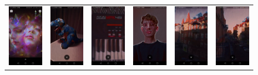 \documentclass[../Main.tex]{subfiles}
\begin{document}
\begin{figure}[H]
\begin{tabular}{cccccc}
\includegraphics[width = 0.13\linewidth]{Images/app_photos/filters/lets.jpg} &
\includegraphics[width = 0.13\linewidth]{Images/app_photos/dino/lets.jpg} &
\includegraphics[width = 0.13\linewidth]{Images/app_photos/akai/lets.jpg} &
\includegraphics[width = 0.13\linewidth]{Images/app_photos/me/lets.jpg} &
\includegraphics[width = 0.13\linewidth]{Images/app_photos/kamienica/lets.jpg} &
\includegraphics[width = 0.13\linewidth]{Images/app_photos/ulica/lets.jpg} \\


\end{tabular}
\end{figure}
\end{document}
